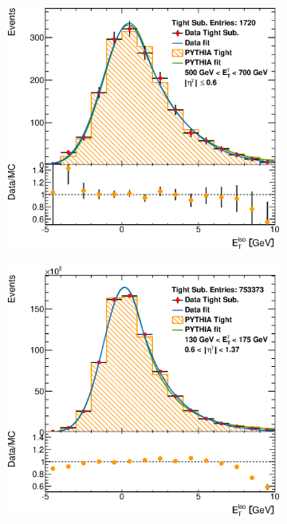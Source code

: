 \documentclass[12pt, twoside]{article}
\numberwithin{equation}{section}
\numberwithin{figure}{section}
\newenvironment{changemargin}[2]{%
\begin{list}{}{%
\setlength{\topsep}{0pt}%
\setlength{\leftmargin}{#1}%
\setlength{\rightmargin}{#2}%
\setlength{\listparindent}{\parindent}%
\setlength{\itemindent}{\parindent}%
\setlength{\parsep}{\parskip}%
}%
\item[]}{\end{list}}
\begin{document}
\begin{figure}[H]
\begin{changemargin}{-1.0cm}{-0.75cm}
\begin{changemargin}{-0.75cm}{-1.0cm}
        \begin{subfigure}[b]{0.27\textwidth}
            \includegraphics[width=\textwidth]{./images/EtISOCorrection/T_MC_FITS-15(10GeV)(After).eps}
        \end{subfigure}
        \begin{subfigure}[b]{0.27\textwidth}
            \includegraphics[width=\textwidth]{./images/EtISOCorrection/T_MC_FITS-21(10GeV)(After).eps}

\end{subfigure}
\end{changemargin}
\end{changemargin}
\end{figure}
\end{document}
